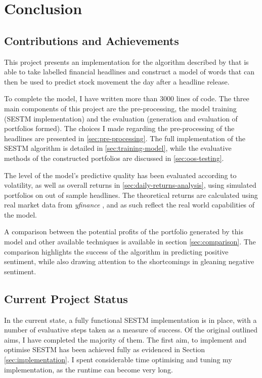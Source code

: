 \chapter{Conclusion}
\label{chap:conclusion}

\section{Contributions and Achievements}
This project presents an implementation for the algorithm described by \textcite{sestm} that is able to take labelled financial headlines and construct a model of words that can then be used to predict stock movement the day after a headline release.

To complete the model, I have written more than 3000 lines of code. The three main components of this project are the pre-processing, the model training (SESTM implementation) and the evaluation (generation and evaluation of portfolios formed). The choices I made regarding the pre-processing of the headlines are presented in \ref{sec:pre-processing}. The full implementation of the SESTM algorithm is detailed in \ref{sec:training-model}, while the evaluative methods of the constructed portfolios are discussed in \ref{sec:oos-testing}.

The level of the model's predictive quality has been evaluated according to volatility, as well as overall returns in \ref{sec:daily-returns-analysis}, using simulated portfolios on out of sample headlines. The theoretical returns are calculated using real market data from \textit{yfinance} \parencite{yfinance}, and as such reflect the real world capabilities of the model.

A comparison between the potential profits of the portfolio generated by this model and other available techniques is available in section \ref{sec:comparison}. The comparison highlights the success of the algorithm in predicting positive sentiment, while also drawing attention to the shortcomings in gleaning negative sentiment.

\section{Current Project Status}
In the current state, a fully functional SESTM implementation is in place, with a number of evaluative steps taken as a measure of success. Of the original outlined aims, I have completed the majority of them. The first aim, to implement and optimise SESTM has been achieved fully as evidenced in Section \ref{sec:implementation}. I spent considerable time optimising and tuning my implementation, as the runtime can become very long.

